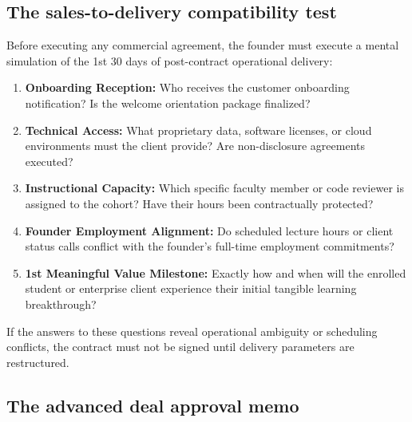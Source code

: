\subsection{The sales-to-delivery compatibility test}

Before executing any commercial agreement, the founder must execute a mental simulation of the 1st 30 days of post-contract operational delivery:
\begin{enumerate}
\item \textbf{Onboarding Reception:} Who receives the customer onboarding notification? Is the welcome orientation package finalized?
\item \textbf{Technical Access:} What proprietary data, software licenses, or cloud environments must the client provide? Are non-disclosure agreements executed?
\item \textbf{Instructional Capacity:} Which specific faculty member or code reviewer is assigned to the cohort? Have their hours been contractually protected?
\item \textbf{Founder Employment Alignment:} Do scheduled lecture hours or client status calls conflict with the founder's full-time employment commitments?
\item \textbf{1st Meaningful Value Milestone:} Exactly how and when will the enrolled student or enterprise client experience their initial tangible learning breakthrough?
\end{enumerate}
If the answers to these questions reveal operational ambiguity or scheduling conflicts, the contract must not be signed until delivery parameters are restructured.

\subsection{The advanced deal approval memo}

